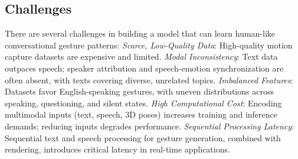 






\subsection{Challenges}
\label{sec:difficult}

There are several challenges in building a model that can learn human-like conversational gesture patterns: \textit{Scarce, Low-Quality Data}: High-quality motion capture datasets are expensive and limited.
\textit{Modal Inconsistency}: Text data outpaces speech; speaker attribution and speech-emotion synchronization are often absent, with texts covering diverse, unrelated topics.
\textit{Imbalanced Features}: Datasets favor English-speaking gestures, with uneven distributions across speaking, questioning, and silent states.
\textit{High Computational Cost}: Encoding multimodal inputs (text, speech, 3D poses) increases training and inference demands; reducing inputs degrades performance.
\textit{Sequential Processing Latency}: Sequential text and speech processing for gesture generation, combined with rendering, introduces critical latency in real-time applications.

